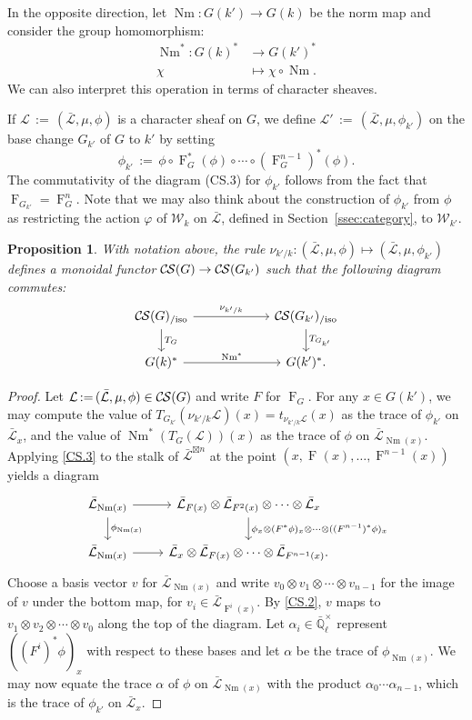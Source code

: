\documentclass[10pt]{amsart}
\theoremstyle{plain}
\newtheorem{proposition}[theorem]{Proposition}
\theoremstyle{definition}
\theoremstyle{remark}
\newcommand{\EE}{\mathbb{\bar Q}_\ell}
\newcommand{\EEx}{\EE^\times}
\newcommand{\Weil}[1]{\mathcal{W}_{#1}}
\newcommand{\Frob}[1]{\operatorname{F}_{#1}}
\DeclareMathOperator{\Nm}{Nm}
\newcommand{\ceq}{{\, :=\, }}
\newcommand{\TrFrob}[1]{T_{#1}}
\newcommand{\cs}[1]{{\mathcal{#1}}}
\newcommand{\gcs}[1]{{\mathcal{\bar #1}}}
\newcommand{\CS}{{\mathcal{C\hskip-0.8pt S}}}
\newcommand{\CSiso}[1]{\CS(#1)_{/\text{iso}}}
\begin{document}
In the opposite direction, let $\Nm : G(k') \to G(k)$ be the norm map and consider the group homomorphism:
\begin{align*}
\Nm^* : G(k)^* &\to G(k')^* \\
\chi &\mapsto \chi\circ \Nm.
\end{align*}
We can also interpret this operation in terms of character sheaves.

If $\cs{L} \ceq (\gcs{L}, \mu, \phi)$ is a character sheaf on $G$, we define
$\cs{L}' \ceq (\gcs{L}, \mu, \phi_{k'})$ on the base change
$G_{k'}$ of $G$ to $k'$ by setting
\[
\phi_{k'} \ceq \phi \circ \Frob{G}^*(\phi) \circ \cdots \circ (\Frob{G}^{n-1})^*(\phi).
\]
The commutativity of the diagram (CS.3) for $\phi_{k'}$
follows from the fact that $\Frob{G_{k'}} = \Frob{G}^n$.
Note that we may also think about the construction of $\phi_{k'}$ from $\phi$
as restricting the action $\varphi$ of $\Weil{k}$ on $\gcs{L}$,
defined in Section~\ref{ssec:category}, to $\Weil{k'}$.

\begin{proposition}\label{prop:basechange}
With notation above,
the rule $\nu_{k'/k}: (\gcs{L}, \mu, \phi) \mapsto (\gcs{L}, \mu, \phi_{k'})$
 defines a monoidal functor $\CS(G) \to \CS(G_{k'})$
 such that the following diagram commutes:
\[
\begin{tikzcd}[column sep=60]
\CSiso{G} \rar{\nu_{k'/k}} \dar{\TrFrob{G}} & \CSiso{G_{k'}} \dar{\TrFrob{G_{k'}}} \\
G(k)^*  \rar{\Nm^*} & G(k')^*.
\end{tikzcd}
\]
\end{proposition}

\begin{proof}
Let $\cs{L} \ceq (\gcs{L}, \mu, \phi) \in \CS(G)$ and write $F$ for $\Frob{G}$.  For any $x \in G(k')$,
we may compute the value of $\TrFrob{G_{k'}}(\nu_{k'/k}\cs{L})(x)= t_{\nu_{k'/k}\cs{L}}(x)$ as the trace of $\phi_{k'}$ on $\gcs{L}_x$,
and the value of $\Nm^*(\TrFrob{G}(\cs{L}))(x)$ as the trace of $\phi$ on $\gcs{L}_{\Nm(x)}$.
Applying \ref{CS.3} to the stalk of $\gcs{L}^{\boxtimes n}$ at the point $(x, \Frob{}(x), \ldots, \Frob{}^{n-1}(x))$ yields a diagram
\[
\begin{tikzcd}
\gcs{L}_{\Nm(x)} \rar \dar{\phi_{\Nm(x)}} & \gcs{L}_{F(x)} \otimes \gcs{L}_{F^2(x)} \otimes \cdots \otimes \gcs{L}_x
\dar{\phi_x \otimes (F^*\phi)_x \otimes \cdots \otimes ((F^{n-1})^*\phi)_x} \\
\gcs{L}_{\Nm(x)} \rar & \gcs{L}_x \otimes \gcs{L}_{F(x)} \otimes \cdots \otimes \gcs{L}_{F^{n-1}(x)}.
\end{tikzcd}
\]
Choose a basis vector $v$ for $\gcs{L}_{\Nm(x)}$ and write $v_0 \otimes v_1 \otimes \cdots \otimes v_{n-1}$ for the image of $v$ under the
bottom map,
for $v_i \in \gcs{L}_{\Frob{}^i(x)}$.  By \ref{CS.2}, $v$ maps to
$v_1 \otimes v_2 \otimes \cdots \otimes v_0$ along the top of the diagram.
Let $\alpha_i \in \EEx$ represent $((F^i)^*\phi)_x$ with respect to these bases and let $\alpha$ be
the trace of $\phi_{\Nm(x)}$.  We may now equate the trace $\alpha$ of $\phi$ on $\gcs{L}_{\Nm(x)}$
with the product $\alpha_0 \cdots \alpha_{n-1}$, which is the trace of $\phi_{k'}$ on $\gcs{L}_x$.
\end{proof}
\end{document}
